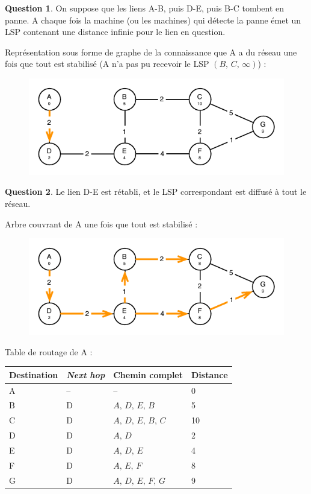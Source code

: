 \documentclass[11pt,english,french]{scrreprt}
\theoremstyle{remark}
\theoremstyle{definition}
\newtheorem{ques}{Question}[section]
\begin{document}
\begin{ques}
	On suppose que les liens A-B, puis D-E, puis B-C tombent en panne. A chaque fois la machine (ou les machines) qui détecte la panne émet un LSP contenant une distance infinie pour le lien en question. 
	
	Représentation sous forme de graphe de la connaissance que A a du réseau une fois que tout est stabilisé (A n'a pas pu recevoir le LSP $(B,\,C,\,\infty)$) :
	\begin{figure}[h]
		\center
		\includegraphics[scale=1]{Exam2009/graphe3}
	\end{figure}
\end{ques}

\begin{ques}
	Le lien D-E est rétabli, et le LSP correspondant est diffusé à tout le réseau.
	
	Arbre couvrant de A une fois que tout est stabilisé :
	\begin{figure}[h]
		\center
		\includegraphics[scale=1]{Exam2009/graphe4}
	\end{figure}
	
	Table de routage de A :\\
	\begin{tabularx}{\textwidth}{XXXX}
		\toprule 
		Destination & \emph{Next hop} & Chemin complet & Distance\tabularnewline
		\midrule
		\midrule 
		A & -- & -- & 0\tabularnewline
		\midrule 
		B & D & $A,\,D,\,E,\,B$ & 5\tabularnewline
		\midrule 
		C & D & $A,\,D,\,E,\,B,\,C$ & 10\tabularnewline
		\midrule 
		D & D & $A,\,D$ & 2\tabularnewline
		\midrule 
		E & D & $A,\,D,\,E$ & 4 \tabularnewline
		\midrule 
		F & D & $A,\,E,\,F$ & 8\tabularnewline
		\midrule 
		G & D & $A,\,D,\,E,\,F,\,G$ & 9 \tabularnewline
		\bottomrule
	\end{tabularx}
\end{ques}
\end{document}
